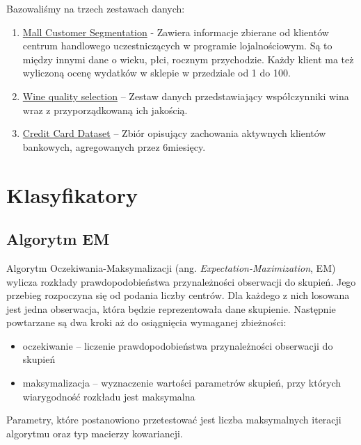 \documentclass[a4paper,11pt]{article}
\begin{document}
Bazowaliśmy na trzech zestawach danych:

\begin{enumerate}[label=\Alph*.] \label{enum:datasets}
    \item{\href{https://www.kaggle.com/vjchoudhary7/customer-segmentation-tutorial-in-python}{Mall Customer Segmentation}} - Zawiera informacje zbierane od klientów centrum handlowego uczestniczących w programie lojalnościowym. Są to między innymi dane o wieku, płci, rocznym przychodzie. Każdy klient ma też wyliczoną ocenę wydatków w sklepie w przedziale od 1 do 100.
    \item{\href{https://www.kaggle.com/maitree/wine-quality-selection#winequality-red.csv}{Wine quality selection}} -- Zestaw danych przedstawiający współczynniki wina wraz z przyporządkowaną ich jakością.
    \item{\href{https://www.kaggle.com/arjunbhasin2013/ccdata}{Credit Card Dataset}} -- Zbiór opisujący zachowania aktywnych klientów bankowych, agregowanych przez 6miesięcy.
\end{enumerate}

\section{Klasyfikatory}

\subsection{Algorytm EM}

Algorytm Oczekiwania-Maksymalizacji (ang. \textit{Expectation-Maximization}, EM) wylicza rozkłady prawdopodobieństwa przynależności obserwacji do skupień. Jego przebieg rozpoczyna się od podania liczby centrów. Dla każdego z nich losowana jest jedna obserwacja, która będzie reprezentowała dane skupienie. Następnie powtarzane są dwa kroki aż do osiągnięcia wymaganej zbieżności:

\begin{itemize}
    \item oczekiwanie -- liczenie prawdopodobieństwa przynależności obserwacji do skupień
    \item maksymalizacja -- wyznaczenie wartości parametrów skupień, przy których wiarygodność rozkładu jest maksymalna
\end{itemize}

Parametry, które postanowiono przetestować jest liczba maksymalnych iteracji algorytmu oraz typ macierzy kowariancji.
\end{document}
